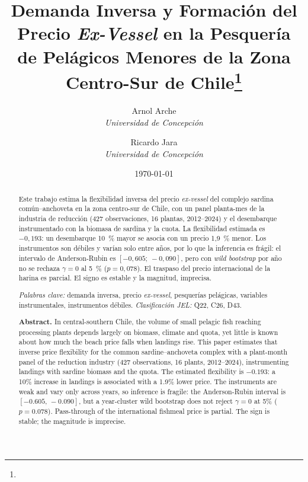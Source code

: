 \documentclass[11pt]{article}
\title{Demanda Inversa y Formación del Precio \textit{Ex-Vessel} en la Pesquería de Pelágicos Menores de la Zona Centro-Sur de Chile\thanks{\acknowledgements}}
\author{
  Arnol Arche\\ {\itshape\large Universidad de Concepción\/}
  \and
  Ricardo Jara\\ {\itshape\large Universidad de Concepción\/}
}
\date{\today}
\begin{document}
\maketitle
\begin{abstract}
  \small
  Este trabajo estima la flexibilidad inversa del precio \textit{ex-vessel} del complejo sardina común--anchoveta en la zona centro-sur de Chile, con un panel planta-mes de la industria de reducción (427 observaciones, 16 plantas, 2012--2024) y el desembarque instrumentado con la biomasa de sardina y la cuota. La flexibilidad estimada es $-0{,}193$: un desembarque 10~\% mayor se asocia con un precio 1,9~\% menor. Los instrumentos son débiles y varían solo entre años, por lo que la inferencia es frágil: el intervalo de Anderson-Rubin es $[-0{,}605;\ -0{,}090]$, pero con \textit{wild bootstrap} por año no se rechaza $\gamma=0$ al 5~\% ($p=0{,}078$). El traspaso del precio internacional de la harina es parcial. El signo es estable y la magnitud, imprecisa.

  \smallskip\noindent\textit{Palabras clave:} demanda inversa, precio \textit{ex-vessel}, pesquerías pelágicas, variables instrumentales, instrumentos débiles. \textit{Clasificación JEL:} Q22, C26, D43.
\end{abstract}

\begin{otherlanguage}{english}
\begin{abstract}
  \small
  \noindent\textbf{Abstract.} In central-southern Chile, the volume of small pelagic fish reaching processing plants depends largely on biomass, climate and quota, yet little is known about how much the beach price falls when landings rise. This paper estimates that inverse price flexibility for the common sardine--anchoveta complex with a plant-month panel of the reduction industry (427 observations, 16 plants, 2012--2024), instrumenting landings with sardine biomass and the quota. The estimated flexibility is $-0.193$: a 10\% increase in landings is associated with a 1.9\% lower price. The instruments are weak and vary only across years, so inference is fragile: the Anderson-Rubin interval is $[-0.605,\,-0.090]$, but a year-cluster wild bootstrap does not reject $\gamma=0$ at 5\% ($p=0.078$). Pass-through of the international fishmeal price is partial. The sign is stable; the magnitude is imprecise.
\end{abstract}
\end{otherlanguage}
\newpage
\end{document}
